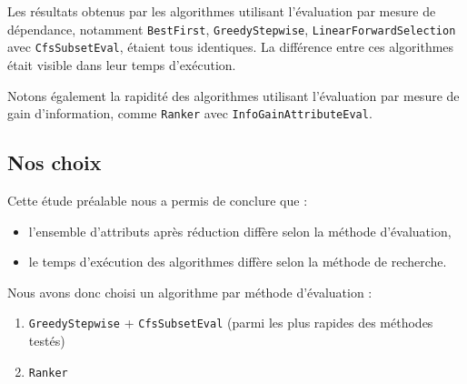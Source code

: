 Les résultats obtenus par les algorithmes utilisant l'évaluation par mesure de dépendance, notamment \texttt{BestFirst}, \texttt{GreedyStepwise}, \texttt{LinearForwardSelection} avec \texttt{CfsSubsetEval}, étaient tous identiques. La différence entre ces algorithmes était visible dans leur temps d'exécution.   

Notons également la rapidité des algorithmes utilisant l'évaluation par mesure de gain d'information, comme \texttt{Ranker} avec \texttt{InfoGainAttributeEval}.
\subsection{Nos choix}

Cette étude préalable nous a permis de conclure que :

\begin{itemize}
	\item l'ensemble d'attributs après réduction diffère selon la méthode d'évaluation,
	\item le temps d'exécution des algorithmes diffère selon la méthode de recherche.
\end{itemize}

Nous avons donc choisi un algorithme par méthode d'évaluation : 
\begin{enumerate}
\item \texttt{GreedyStepwise} + \texttt{CfsSubsetEval} (parmi les plus rapides des méthodes testés)
\item \texttt{Ranker}
\end{enumerate}
